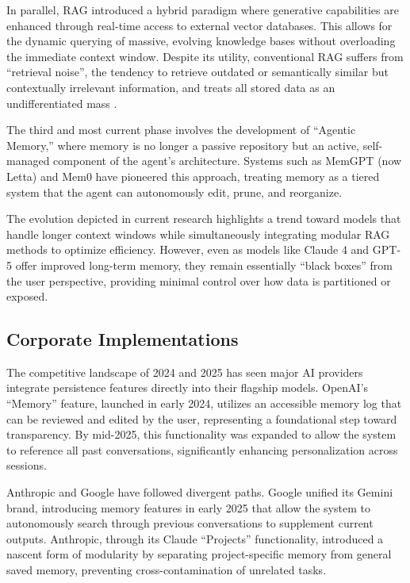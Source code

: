 \documentclass[12pt,a4paper]{article}
\begin{document}
In parallel, RAG introduced a hybrid paradigm where generative capabilities are enhanced through real-time access to external vector databases. This allows for the dynamic querying of massive, evolving knowledge bases without overloading the immediate context window. Despite its utility, conventional RAG suffers from ``retrieval noise'', the tendency to retrieve outdated or semantically similar but contextually irrelevant information, and treats all stored data as an undifferentiated mass \cite{li2024retrieval}.

The third and most current phase involves the development of ``Agentic Memory,'' where memory is no longer a passive repository but an active, self-managed component of the agent's architecture. Systems such as MemGPT \cite{packer2023memgpt} (now Letta) and Mem0 \cite{chhikara2025mem0} have pioneered this approach, treating memory as a tiered system that the agent can autonomously edit, prune, and reorganize.

The evolution depicted in current research highlights a trend toward models that handle longer context windows while simultaneously integrating modular RAG methods to optimize efficiency. However, even as models like Claude 4 and GPT-5 offer improved long-term memory, they remain essentially ``black boxes'' from the user perspective, providing minimal control over how data is partitioned or exposed.

\subsection{Corporate Implementations}

The competitive landscape of 2024 and 2025 has seen major AI providers integrate persistence features directly into their flagship models. OpenAI's ``Memory'' feature, launched in early 2024, utilizes an accessible memory log that can be reviewed and edited by the user, representing a foundational step toward transparency. By mid-2025, this functionality was expanded to allow the system to reference all past conversations, significantly enhancing personalization across sessions.

Anthropic and Google have followed divergent paths. Google unified its Gemini brand, introducing memory features in early 2025 that allow the system to autonomously search through previous conversations to supplement current outputs. Anthropic, through its Claude ``Projects'' functionality, introduced a nascent form of modularity by separating project-specific memory from general saved memory, preventing cross-contamination of unrelated tasks.
\end{document}
